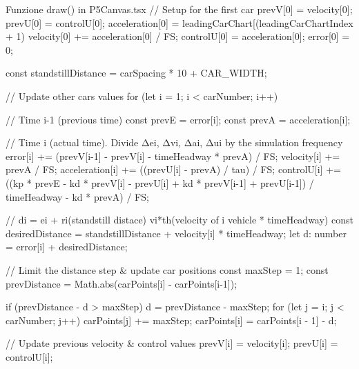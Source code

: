 \begin{tsCode}{Funzione draw() in P5Canvas.tsx}
// Setup for the first car
prevV[0] = velocity[0];
prevU[0] = controlU[0];
acceleration[0] = leadingCarChart[(leadingCarChartIndex + 1) %
velocity[0] += acceleration[0] / FS;
controlU[0] = acceleration[0];
error[0] = 0;

const standstillDistance = carSpacing * 10 + CAR_WIDTH;

// Update other cars values
for (let i = 1; i < carNumber; i++) {
  // Time i-1 (previous time)
  const prevE = error[i];
  const prevA = acceleration[i];

  // Time i (actual time). Divide Δei, Δvi, Δai, Δui by the simulation frequency 
  error[i] += (prevV[i-1] - prevV[i] - timeHeadway * prevA) / FS;
  velocity[i] += prevA / FS;
  acceleration[i] += ((prevU[i] - prevA) / tau) / FS;
  controlU[i] += ((kp * prevE - kd * prevV[i] - prevU[i] + kd * prevV[i-1] + prevU[i-1]) / timeHeadway - kd * prevA) / FS;

  // di = ei + ri(standstill distace) vi*th(velocity of i vehicle * timeHeadway)
  const desiredDistance = standstillDistance + velocity[i] * timeHeadway;
  let d: number = error[i] + desiredDistance;

  // Limit the distance step & update car positions
  const maxStep = 1;
  const prevDistance = Math.abs(carPoints[i] - carPoints[i-1]);

  if (prevDistance - d > maxStep) {
    d = prevDistance - maxStep;
    for (let j = i; j < carNumber; j++) {
      carPoints[j] += maxStep;
    }
  }
  carPoints[i] = carPoints[i - 1] - d;

  // Update previous velocity & control values
  prevV[i] = velocity[i];
  prevU[i] = controlU[i];
}
\end{tsCode}